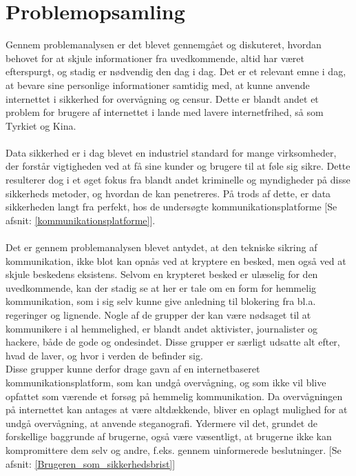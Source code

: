 \section{Problemopsamling}
Gennem problemanalysen er det blevet gennemgået og diskuteret, hvordan behovet for at skjule informationer fra uvedkommende, altid har været efterspurgt, og stadig er nødvendig den dag i dag. Det er et relevant emne i dag, at bevare sine personlige informationer samtidig med, at kunne anvende internettet i sikkerhed for overvågning og censur. Dette er blandt andet et problem for brugere af internettet i lande med lavere internetfrihed, så som Tyrkiet og Kina.\cite{FreedomHouseRapport2017}
\\\\
Data sikkerhed er i dag blevet en industriel standard for mange virksomheder, der forstår vigtigheden ved at få sine kunder og brugere til at føle sig sikre. Dette resulterer dog i et øget fokus fra blandt andet kriminelle og myndigheder på disse sikkerheds metoder, og hvordan de kan penetreres. På trods af dette, er data sikkerheden langt fra perfekt, hos de undersøgte kommunikationsplatforme [Se afsnit: \ref{kommunikationsplatforme}].
\\\\
Det er gennem problemanalysen blevet antydet, at den tekniske sikring af kommunikation, ikke blot kan opnås ved at kryptere en besked, men også ved at skjule beskedens eksistens. Selvom en krypteret besked er ulæselig for den uvedkommende, kan der stadig se at her er tale om en form for hemmelig kommunikation, som i sig selv kunne give anledning til blokering fra bl.a. regeringer og lignende. Nogle af de grupper der kan være nødsaget til at kommunikere i al hemmelighed, er blandt andet aktivister, journalister og hackere, både de gode og ondesindet. Disse grupper er særligt udsatte alt efter, hvad de laver, og hvor i verden de befinder sig.\cite{FreedomHouseRapport2017}
\\
Disse grupper kunne derfor drage gavn af en internetbaseret kommunikationsplatform, som kan undgå overvågning, og som ikke vil blive opfattet som værende et forsøg på hemmelig kommunikation. 
Da overvågningen på internettet kan antages at være altdækkende, bliver en oplagt mulighed for at undgå overvågning, at anvende steganografi. Ydermere vil det, grundet de forskellige baggrunde af brugerne, også være væsentligt, at brugerne ikke kan kompromittere dem selv og andre, f.eks. gennem uinformerede beslutninger. [Se afsnit: \ref{Brugeren_som_sikkerhedsbrist}]